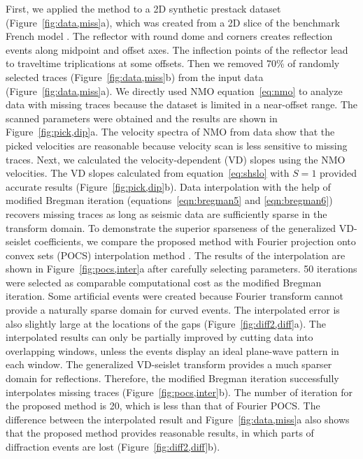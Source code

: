 First, we applied the method to a 2D synthetic prestack dataset
(Figure~\ref{fig:data,miss}a), which was created from a 2D slice of
the benchmark French model \cite[]{french74}. The reflector with round
dome and corners creates reflection events along midpoint and offset
axes. The inflection points of the reflector lead to traveltime
triplications at some offsets. Then we removed 70\% of randomly
selected traces (Figure~\ref{fig:data,miss}b) from the input data
(Figure~\ref{fig:data,miss}a). We directly used NMO
equation~\ref{eq:nmo} to analyze data with missing traces because the
dataset is limited in a near-offset range. The scanned parameters were
obtained and the results are shown in Figure~\ref{fig:pick,dip}a. The
velocity spectra of NMO from data show that the picked velocities are
reasonable because velocity scan is less sensitive to missing
traces. Next, we calculated the velocity-dependent (VD) slopes using
the NMO velocities. The VD slopes calculated from
equation~\ref{eq:shslo} with $S=1$ provided accurate results
(Figure~\ref{fig:pick,dip}b). Data interpolation with the help of
modified Bregman iteration (equations~\ref{eqn:bregman5}
and \ref{eqn:bregman6}) recovers missing traces as long as seismic
data are sufficiently sparse in the transform domain. To demonstrate
the superior sparseness of the generalized VD-seislet coefficients, we
compare the proposed method with Fourier projection onto convex sets
(POCS) interpolation method \cite[]{pocs}. The results of the
interpolation are shown in Figure~\ref{fig:pocs,inter}a after
carefully selecting parameters. 50 iterations were selected as
comparable computational cost as the modified Bregman iteration. Some
artificial events were created because Fourier transform cannot
provide a naturally sparse domain for curved events. The interpolated
error is also slightly large at the locations of the gaps
(Figure~\ref{fig:diff2,diff}a). The interpolated results can only be
partially improved by cutting data into overlapping windows, unless
the events display an ideal plane-wave pattern in each window. The
generalized VD-seislet transform provides a much sparser domain for
reflections.  Therefore, the modified Bregman iteration successfully
interpolates missing traces (Figure~\ref{fig:pocs,inter}b). The number
of iteration for the proposed method is 20, which is less than that of
Fourier POCS. The difference between the interpolated result and
Figure~\ref{fig:data,miss}a also shows that the proposed method
provides reasonable results, in which parts of diffraction events are
lost (Figure~\ref{fig:diff2,diff}b).

